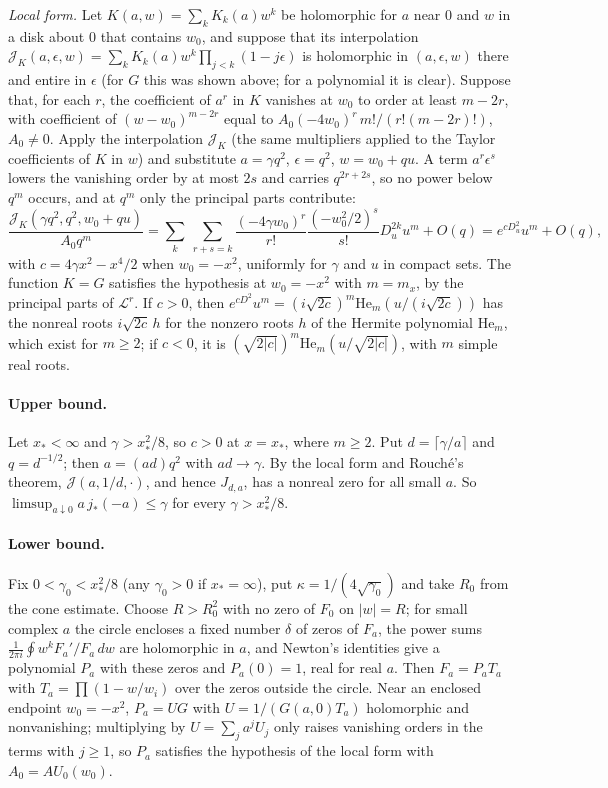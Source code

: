 \documentclass[11pt,a4paper]{article}
\theoremstyle{plain}
\theoremstyle{remark}
\begin{document}
\emph{Local form.} Let $K(a,w)=\sum_kK_k(a)w^k$ be holomorphic for $a$ near $0$ and $w$ in a disk about $0$ that
contains $w_0$, and suppose that its interpolation $\mathcal J_K(a,\epsilon,w)=\sum_kK_k(a)w^k\prod_{j<k}(1-j\epsilon)$
is holomorphic in $(a,\epsilon,w)$ there and entire in $\epsilon$ (for $G$ this was shown above; for a polynomial it is
clear). Suppose that, for each $r$, the coefficient of $a^r$ in $K$
vanishes at $w_0$ to order at least $m-2r$, with coefficient of $(w-w_0)^{m-2r}$ equal to
$A_0(-4w_0)^r\,m!/(r!(m-2r)!)$, $A_0\ne0$. Apply the interpolation $\mathcal J_K$ (the same multipliers applied to the
Taylor coefficients of $K$ in $w$) and substitute $a=\gamma q^2$, $\epsilon=q^2$, $w=w_0+qu$. A term
$a^r\epsilon^s$ lowers the vanishing order by at most $2s$ and carries $q^{2r+2s}$, so no power below $q^m$ occurs, and
at $q^m$ only the principal parts contribute:
\[
 \frac{\mathcal J_K(\gamma q^2,q^2,w_0+qu)}{A_0q^m}=\sum_{k}\ \sum_{r+s=k}\frac{(-4\gamma w_0)^r}{r!}\frac{(-w_0^2/2)^s}{s!}
 D_u^{2k}u^m+O(q)=e^{c D_u^2}u^m+O(q),
\]
with $c=4\gamma x^2-x^4/2$ when $w_0=-x^2$, uniformly for $\gamma$ and $u$ in compact sets. The function $K=G$ satisfies
the hypothesis at $w_0=-x^2$ with $m=m_x$, by the principal parts of $\mathcal L^r$. If $c>0$, then
$e^{cD^2}u^m=(i\sqrt{2c})^m\mathrm{He}_m(u/(i\sqrt{2c}))$ has the nonreal roots $i\sqrt{2c}\,h$ for the nonzero roots
$h$ of the Hermite polynomial $\mathrm{He}_m$, which exist for $m\ge2$; if $c<0$, it is
$(\sqrt{2|c|})^m\mathrm{He}_m(u/\sqrt{2|c|})$, with $m$ simple real roots.

\paragraph{Upper bound.}
Let $x_*<\infty$ and $\gamma>x_*^2/8$, so $c>0$ at $x=x_*$, where $m\ge2$. Put $d=\lceil\gamma/a\rceil$ and $q=d^{-1/2}$; then
$a=(ad)q^2$ with $ad\to\gamma$. By the local form and Rouch\'e's theorem, $\mathcal J(a,1/d,\cdot)$, and hence
$J_{d,a}$, has a nonreal zero for all small $a$. So $\limsup_{a\downarrow0}a\,j_*(-a)\le\gamma$ for every
$\gamma>x_*^2/8$.

\paragraph{Lower bound.}
Fix $0<\gamma_0<x_*^2/8$ (any $\gamma_0>0$ if $x_*=\infty$), put $\kappa=1/(4\sqrt{\gamma_0})$ and take $R_0$ from the
cone estimate. Choose $R>R_0^2$ with no zero of $F_0$ on $|w|=R$; for small complex $a$ the circle encloses a fixed
number $\delta$ of zeros of $F_a$, the power sums $\frac1{2\pi i}\oint w^kF_a'/F_a\,dw$ are holomorphic in $a$, and Newton's
identities give a polynomial $P_a$ with these zeros and $P_a(0)=1$, real for real $a$. Then $F_a=P_aT_a$ with
$T_a=\prod(1-w/w_i)$ over the zeros outside the circle. Near an enclosed endpoint $w_0=-x^2$, $P_a=UG$ with $U=1/(G(a,0)T_a)$
holomorphic and nonvanishing; multiplying by $U=\sum_ja^jU_j$ only raises vanishing orders in the terms with
$j\ge1$, so $P_a$ satisfies the hypothesis of the local form with $A_0=AU_0(w_0)$.
\end{document}
